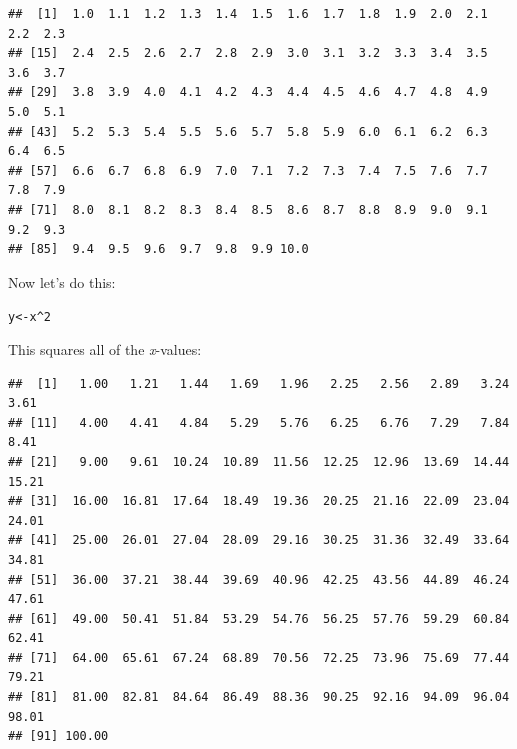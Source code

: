 \documentclass{article}\usepackage[]{graphicx}\usepackage[]{color}
\makeatletter
\newcommand{\hlnum}[1]{\textcolor[rgb]{0.686,0.059,0.569}{#1}}%
\newcommand{\hlopt}[1]{\textcolor[rgb]{0,0,0}{#1}}%
\newcommand{\hlstd}[1]{\textcolor[rgb]{0.345,0.345,0.345}{#1}}%
\newcommand{\hlkwb}[1]{\textcolor[rgb]{0.69,0.353,0.396}{#1}}%
\newenvironment{kframe}{%
 \def\at@end@of@kframe{}%
 \ifinner\ifhmode%
  \def\at@end@of@kframe{\end{minipage}}%
  \begin{minipage}{\columnwidth}%
 \fi\fi%
 \def\FrameCommand##1{\hskip\@totalleftmargin \hskip-\fboxsep
 \colorbox{shadecolor}{##1}\hskip-\fboxsep
     \hskip-\linewidth \hskip-\@totalleftmargin \hskip\columnwidth}%
 \MakeFramed {\advance\hsize-\width
   \@totalleftmargin\z@ \linewidth\hsize
   \@setminipage}}%
 {\par\unskip\endMakeFramed%
 \at@end@of@kframe}
\newenvironment{knitrout}{}{} %
\makeatother
\begin{document}
\begin{knitrout}
\color{fgcolor}\begin{kframe}
\begin{verbatim}
##  [1]  1.0  1.1  1.2  1.3  1.4  1.5  1.6  1.7  1.8  1.9  2.0  2.1  2.2  2.3
## [15]  2.4  2.5  2.6  2.7  2.8  2.9  3.0  3.1  3.2  3.3  3.4  3.5  3.6  3.7
## [29]  3.8  3.9  4.0  4.1  4.2  4.3  4.4  4.5  4.6  4.7  4.8  4.9  5.0  5.1
## [43]  5.2  5.3  5.4  5.5  5.6  5.7  5.8  5.9  6.0  6.1  6.2  6.3  6.4  6.5
## [57]  6.6  6.7  6.8  6.9  7.0  7.1  7.2  7.3  7.4  7.5  7.6  7.7  7.8  7.9
## [71]  8.0  8.1  8.2  8.3  8.4  8.5  8.6  8.7  8.8  8.9  9.0  9.1  9.2  9.3
## [85]  9.4  9.5  9.6  9.7  9.8  9.9 10.0
\end{verbatim}
\end{kframe}
\end{knitrout}

Now let's do this:

\begin{knitrout}
\color{fgcolor}\begin{kframe}
\begin{alltt}
\hlstd{y}\hlkwb{<-}\hlstd{x}\hlopt{^}\hlnum{2}
\end{alltt}
\end{kframe}
\end{knitrout}

\noindent This squares all of the \textit{x}-values:

\begin{knitrout}
\color{fgcolor}\begin{kframe}
\begin{verbatim}
##  [1]   1.00   1.21   1.44   1.69   1.96   2.25   2.56   2.89   3.24   3.61
## [11]   4.00   4.41   4.84   5.29   5.76   6.25   6.76   7.29   7.84   8.41
## [21]   9.00   9.61  10.24  10.89  11.56  12.25  12.96  13.69  14.44  15.21
## [31]  16.00  16.81  17.64  18.49  19.36  20.25  21.16  22.09  23.04  24.01
## [41]  25.00  26.01  27.04  28.09  29.16  30.25  31.36  32.49  33.64  34.81
## [51]  36.00  37.21  38.44  39.69  40.96  42.25  43.56  44.89  46.24  47.61
## [61]  49.00  50.41  51.84  53.29  54.76  56.25  57.76  59.29  60.84  62.41
## [71]  64.00  65.61  67.24  68.89  70.56  72.25  73.96  75.69  77.44  79.21
## [81]  81.00  82.81  84.64  86.49  88.36  90.25  92.16  94.09  96.04  98.01
## [91] 100.00
\end{verbatim}
\end{kframe}
\end{knitrout}
\end{document}
